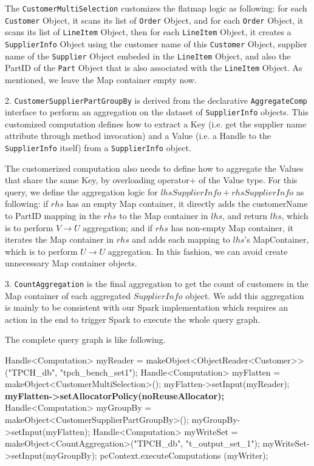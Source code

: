 The
\texttt{CustomerMultiSelection} customizes the flatmap logic as
following: for each \texttt{Customer} Object, it scans its list of
\texttt{Order} Object, and for each \texttt{Order} Object, it scans
its list of \texttt{LineItem} Object, then for each \texttt{LineItem}
Object, it creates a \texttt{SupplierInfo} Object using the customer
name of this \texttt{Customer} Object, supplier name of the
\texttt{Supplier} Object embeded in the \texttt{LineItem} Object, and
also the PartID of the \texttt{Part} Object that is also associated with
the \texttt{LineItem} Object. As mentioned, we leave the Map container
empty now.

\vspace{5pt}
2. \texttt{CustomerSupplierPartGroupBy} is derived from the declarative
\texttt{AggregateComp} interface to perform an aggregation on the
dataset of \texttt{SupplierInfo} objects. This customized computation
defines how to extract a Key (i.e. get the supplier name attribute
through method invocation) and a Value (i.e. a Handle to the \texttt{SupplierInfo} itself) from a
\texttt{SupplierInfo} object. 

The customerized computation also needs
to define how to aggregate the Values that share the same Key,  by
overloading operator+ of the Value type. For this query, we define the aggregation
logic for $lhsSupplierInfo + rhsSupplierInfo$ as following: if
$rhs$ has an empty Map container, it directly adds the
customerName to PartID mapping in the $rhs$ to the Map container in $lhs$, and
return $lhs$, which is to perform $V \rightarrow U$ aggregation;
and if $rhs$ has non-empty Map container, it iterates the Map
container in $rhs$ and adds each mapping to $lhs$'s MapContainer,
which is to perform $U \rightarrow U$ aggregation. In this fashion, we can
avoid create unnecessary Map container objects.

\vspace{5pt}
3. \texttt{CountAggregation} is the final aggregation to get the count of customers in the Map
container of each aggregated $SupplierInfo$ object. We add this
aggregation is mainly to be consistent with our Spark implementation
which requires an action in the end to trigger Spark to execute the
whole query graph.

\vspace{5pt}
The complete query graph is like following. 

\begin{code}
    Handle<Computation> myReader = 
        makeObject<ObjectReader<Customer>>("TPCH_db", "tpch_bench_set1");
    Handle<Computation> myFlatten = makeObject<CustomerMultiSelection>();
    myFlatten->setInput(myReader);
    {\bf myFlatten->setAllocatorPolicy(noReuseAllocator);}
    Handle<Computation> myGroupBy = makeObject<CustomerSupplierPartGroupBy>();
    myGroupBy->setInput(myFlatten);
    Handle<Computation> myWriteSet = 
        makeObject<CountAggregation>("TPCH_db", "t_output_set_1");
    myWriteSet->setInput(myGroupBy);
    pcContext.executeComputations (myWriter);
\end{code}

